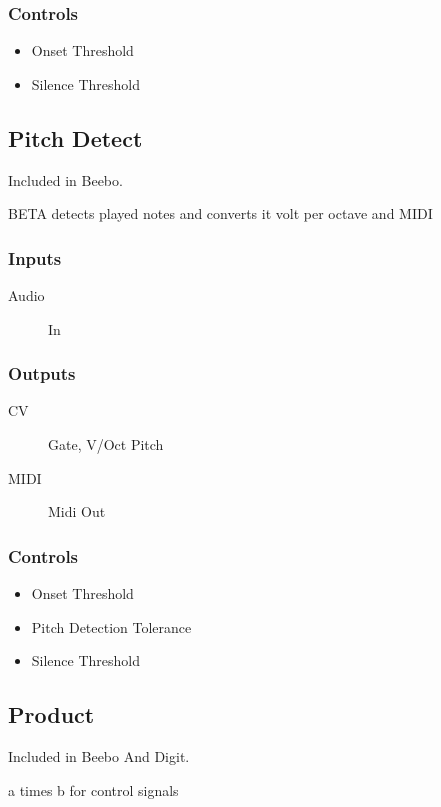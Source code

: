 \subsubsection{Controls}
\begin{itemize}
\item Onset Threshold
\item Silence Threshold
\end{itemize}

\subsection{Pitch Detect}

Included in Beebo.

BETA detects played notes and converts it volt per octave and MIDI



\subsubsection{Inputs}
\begin{description}
\item [Audio] In
\end{description}

\subsubsection{Outputs}
\begin{description}
\item [CV] Gate, V/Oct Pitch
\item [MIDI] Midi Out
\end{description}

\subsubsection{Controls}
\begin{itemize}
\item Onset Threshold
\item Pitch Detection Tolerance
\item Silence Threshold
\end{itemize}

\subsection{Product}

Included in Beebo And Digit.

a times b for control signals



